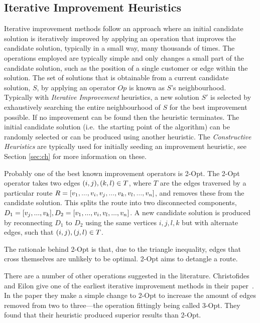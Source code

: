 \subsection{Iterative Improvement Heuristics}

Iterative improvement methods follow an approach where an initial candidate solution is iteratively improved by applying an operation that improves the candidate solution, typically in a small way, many thousands of times. The operations employed are typically simple and only changes a small part of the candidate solution, such as the position of a single customer or edge within the solution. The set of solutions that is obtainable from a current candidate solution, $S$, by applying an operator $Op$ is known as $S$'s neighbourhood. Typically with \emph{Iterative Improvement} heuristics, a new solution $S'$ is selected by exhaustively searching the entire neighbourhood of $S$ for the best improvement possible. If no improvement can be found then the heuristic terminates. The initial candidate solution (i.e.~the starting point of the algorithm) can be randomly selected or can be produced using another heuristic. The \emph{Constructive Heuristics} are typically used for initially seeding an improvement heuristic, see Section \ref{sec:ch} for more information on these.
 
Probably one of the best known improvement operators is 2-Opt. The 2-Opt operator takes two edges $(i,j), (k,l) \in T$, where $T$ are the edges traversed by a particular route $R = [v_1, ..., v_i, v_j, ..., v_k, v_l, ..., v_n]$, and removes these from the candidate solution. This splits the route into two disconnected components, $D_1 = [v_j, ..., v_k], D_2 = [v_1, ..., v_i,v_l, ..., v_n]$. A new candidate solution is produced by reconnecting $D_1$ to $D_2$ using the same vertices $i,j,l,k$ but with alternate edges, such that $(i,j), (j,l) \in T$.


The rationale behind 2-Opt is that, due to the triangle inequality, edges that cross themselves are unlikely to be optimal. 2-Opt aims to detangle a route.

There are a number of other operations suggested in the literature. Christofides and Eilon give one of the earliest iterative improvement methods in their paper~\cite{CE:1969}. In the paper they make a simple change to 2-Opt to increase the amount of edges removed from two to three---the operation fittingly being called 3-Opt. They found that their heuristic produced superior results than 2-Opt.

